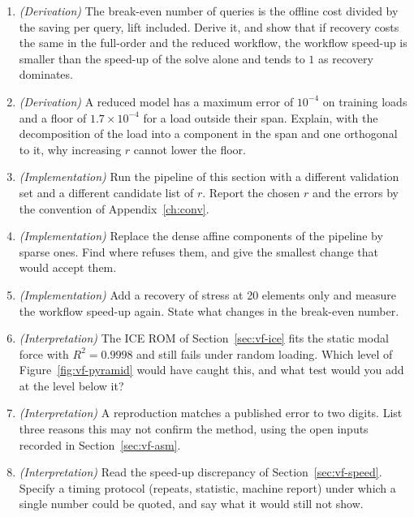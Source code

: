 \begin{enumerate}
\item \emph{(Derivation)} The break-even number of queries is the offline cost divided by the saving per query, lift included. Derive it, and show that if recovery costs the same in the full-order and the reduced workflow, the workflow speed-up is smaller than the speed-up of the solve alone and tends to $1$ as recovery dominates.
\item \emph{(Derivation)} A reduced model has a maximum error of $10^{-4}$ on training loads and a floor of $1.7\times10^{-4}$ for a load outside their span. Explain, with the decomposition of the load into a component in the span and one orthogonal to it, why increasing $r$ cannot lower the floor.
\item \emph{(Implementation)} Run the pipeline of this section with a different validation set and a different candidate list of $r$. Report the chosen $r$ and the errors by the convention of Appendix~\ref{ch:conv}.
\item \emph{(Implementation)} Replace the dense affine components of the pipeline by sparse ones. Find where  refuses them, and give the smallest change that would accept them.
\item \emph{(Implementation)} Add a recovery of stress at 20 elements only and measure the workflow speed-up again. State what changes in the break-even number.
\item \emph{(Interpretation)} The ICE ROM of Section~\ref{sec:vf-ice} fits the static modal force with $R^2=0.9998$ and still fails under random loading. Which level of Figure~\ref{fig:vf-pyramid} would have caught this, and what test would you add at the level below it?
\item \emph{(Interpretation)} A reproduction matches a published error to two digits. List three reasons this may not confirm the method, using the open inputs recorded in Section~\ref{sec:vf-asm}.
\item \emph{(Interpretation)} Read the speed-up discrepancy of Section~\ref{sec:vf-speed}. Specify a timing protocol (repeats, statistic, machine report) under which a single number could be quoted, and say what it would still not show.
\end{enumerate}

\chapterrefs
